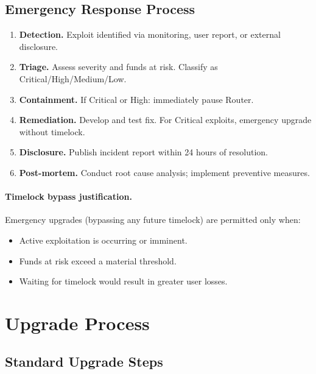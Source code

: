 \subsection{Emergency Response Process}

\begin{enumerate}
\item \textbf{Detection.} Exploit identified via monitoring, user report, or external disclosure.
\item \textbf{Triage.} Assess severity and funds at risk. Classify as Critical/High/Medium/Low.
\item \textbf{Containment.} If Critical or High: immediately pause Router.
\item \textbf{Remediation.} Develop and test fix. For Critical exploits, emergency upgrade without timelock.
\item \textbf{Disclosure.} Publish incident report within 24 hours of resolution.
\item \textbf{Post-mortem.} Conduct root cause analysis; implement preventive measures.
\end{enumerate}

\paragraph{Timelock bypass justification.}
Emergency upgrades (bypassing any future timelock) are permitted only when:
\begin{itemize}
\item Active exploitation is occurring or imminent.
\item Funds at risk exceed a material threshold.
\item Waiting for timelock would result in greater user losses.
\end{itemize}


\section{Upgrade Process}

\subsection{Standard Upgrade Steps}

